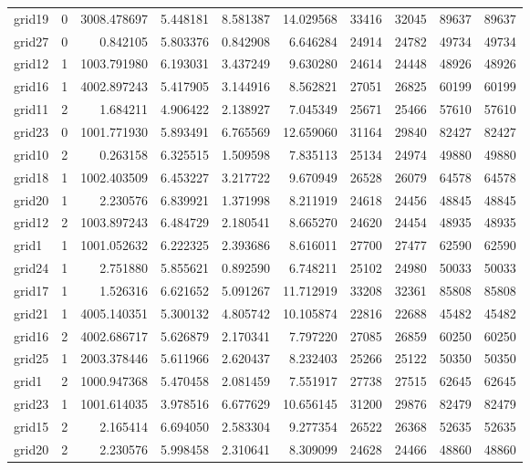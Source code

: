\begin{longtable}{|l|r|r|r|r|r|r|r|r|r|}
grid19 & 0 & 3008.478697 & 5.448181 & 8.581387 & 14.029568 & 33416 & 32045 & 89637 & 89637 \\
grid27 & 0 & 0.842105 & 5.803376 & 0.842908 & 6.646284 & 24914 & 24782 & 49734 & 49734 \\
grid12 & 1 & 1003.791980 & 6.193031 & 3.437249 & 9.630280 & 24614 & 24448 & 48926 & 48926 \\
grid16 & 1 & 4002.897243 & 5.417905 & 3.144916 & 8.562821 & 27051 & 26825 & 60199 & 60199 \\
grid11 & 2 & 1.684211 & 4.906422 & 2.138927 & 7.045349 & 25671 & 25466 & 57610 & 57610 \\
grid23 & 0 & 1001.771930 & 5.893491 & 6.765569 & 12.659060 & 31164 & 29840 & 82427 & 82427 \\
grid10 & 2 & 0.263158 & 6.325515 & 1.509598 & 7.835113 & 25134 & 24974 & 49880 & 49880 \\
grid18 & 1 & 1002.403509 & 6.453227 & 3.217722 & 9.670949 & 26528 & 26079 & 64578 & 64578 \\
grid20 & 1 & 2.230576 & 6.839921 & 1.371998 & 8.211919 & 24618 & 24456 & 48845 & 48845 \\
grid12 & 2 & 1003.897243 & 6.484729 & 2.180541 & 8.665270 & 24620 & 24454 & 48935 & 48935 \\
grid1 & 1 & 1001.052632 & 6.222325 & 2.393686 & 8.616011 & 27700 & 27477 & 62590 & 62590 \\
grid24 & 1 & 2.751880 & 5.855621 & 0.892590 & 6.748211 & 25102 & 24980 & 50033 & 50033 \\
grid17 & 1 & 1.526316 & 6.621652 & 5.091267 & 11.712919 & 33208 & 32361 & 85808 & 85808 \\
grid21 & 1 & 4005.140351 & 5.300132 & 4.805742 & 10.105874 & 22816 & 22688 & 45482 & 45482 \\
grid16 & 2 & 4002.686717 & 5.626879 & 2.170341 & 7.797220 & 27085 & 26859 & 60250 & 60250 \\
grid25 & 1 & 2003.378446 & 5.611966 & 2.620437 & 8.232403 & 25266 & 25122 & 50350 & 50350 \\
grid1 & 2 & 1000.947368 & 5.470458 & 2.081459 & 7.551917 & 27738 & 27515 & 62645 & 62645 \\
grid23 & 1 & 1001.614035 & 3.978516 & 6.677629 & 10.656145 & 31200 & 29876 & 82479 & 82479 \\
grid15 & 2 & 2.165414 & 6.694050 & 2.583304 & 9.277354 & 26522 & 26368 & 52635 & 52635 \\
grid20 & 2 & 2.230576 & 5.998458 & 2.310641 & 8.309099 & 24628 & 24466 & 48860 & 48860 \\

\end{longtable}
